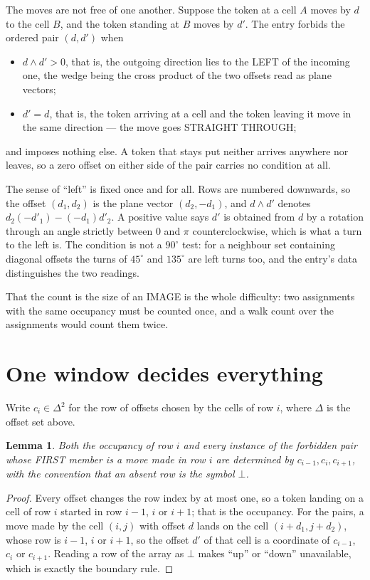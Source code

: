 \documentclass[11pt,a4paper]{article}
\theoremstyle{plain}
\newtheorem{lemma}[theorem]{Lemma}
\theoremstyle{definition}
\begin{document}
The moves are not free of one another. Suppose the token at a cell $A$ moves by $d$ to the
cell $B$, and the token standing at $B$ moves by $d'$. The entry forbids the ordered pair
$(d,d')$ when
\begin{itemize}
\item $d\wedge d'>0$, that is, the outgoing direction lies to the LEFT of the incoming one, the wedge being the cross product of the two offsets read as plane vectors;
\item $d'=d$, that is, the token arriving at a cell and the token leaving it move in the same direction --- the move goes STRAIGHT THROUGH;
\end{itemize}
and imposes nothing else. A token that stays put neither arrives anywhere nor leaves, so a
zero offset on either side of the pair carries no condition at all.

The sense of ``left'' is fixed once and for all. Rows are numbered downwards, so the offset
$(d_1,d_2)$ is the plane vector $(d_2,-d_1)$, and $d\wedge d'$ denotes
$d_2(-d'_1)-(-d_1)d'_2$. A positive value says $d'$ is obtained from $d$ by a rotation through
an angle strictly between $0$ and $\pi$ counterclockwise, which is what a turn to the left is.
The condition is not a $90^\circ$ test: for a neighbour set containing diagonal offsets the
turns of $45^\circ$ and $135^\circ$ are left turns too, and the entry's data distinguishes the
two readings.

That the count is the size of an IMAGE is the whole difficulty: two assignments with the same
occupancy must be counted once, and a walk count over the assignments would count them twice.

\section{One window decides everything}

Write $c_i\in\Delta^{2}$ for the row of offsets chosen by the cells of row $i$, where
$\Delta$ is the offset set above.

\begin{lemma}\label{lem:win}
Both the occupancy of row $i$ and every instance of the forbidden pair whose FIRST member is a
move made in row $i$ are determined by $c_{i-1},c_i,c_{i+1}$, with the convention that an
absent row is the symbol $\bot$.
\end{lemma}

\begin{proof}
Every offset changes the row index by at most one, so a token landing on a cell of row $i$
started in row $i-1$, $i$ or $i+1$; that is the occupancy. For the pairs, a move made by the
cell $(i,j)$ with offset $d$ lands on the cell $(i+d_1,j+d_2)$, whose row is $i-1$, $i$ or
$i+1$, so the offset $d'$ of that cell is a coordinate of $c_{i-1}$, $c_i$ or $c_{i+1}$.
Reading a row of the array as $\bot$ makes ``up'' or ``down'' unavailable, which is exactly
the boundary rule.
\end{proof}
\end{document}
